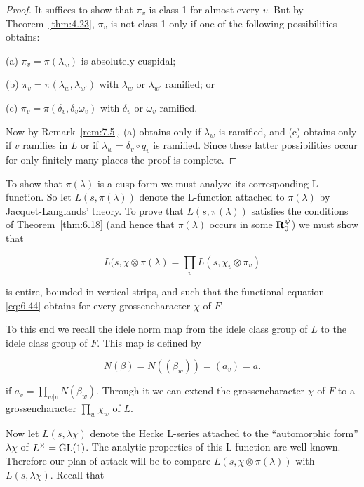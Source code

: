 \begin{proof}

It suffices to show that $\pi_v$ is class 1 for almost every $v$. But by Theorem~\ref{thm:4.23}, $\pi_v$ is not class 1 only if one of the following possibilities obtains:

(a) $\pi_v = \pi(\lambda_w)$ is absolutely cuspidal;

(b) $\pi_v = \pi(\lambda_w, \lambda_{w'})$ with $\lambda_w$ or $\lambda_{w'}$ ramified; or

(c) $\pi_v = \pi(\delta_v, \delta_v\omega_v)$ with $\delta_v$ or $\omega_v$ ramified.

Now by Remark~\ref{rem:7.5}, (a) obtains only if $\lambda_w$ is ramified, and (c) obtains only if $v$ ramifies in $L$ or if $\lambda_w = \delta_v \circ q_v$ is ramified. Since these latter possibilities occur for only finitely many places the proof is complete.

\end{proof}

To show that $\pi(\lambda)$ is a cusp form we must analyze its corresponding L-function. So let $L(s,\pi(\lambda))$ denote the L-function attached to $\pi(\lambda)$ by Jacquet-Langlands' theory. To prove that $L(s,\pi(\lambda))$ satisfies the conditions of Theorem~\ref{thm:6.18} (and hence that $\pi(\lambda)$ occurs in some $\mathbf{R}_0^\psi$) we must show that

\begin{equation}\label{eq:7.24}
L(s, \chi \otimes \pi(\lambda) = \prod_v L(s, \chi_v \otimes \pi_v)\tag{7.24}
\end{equation}

is entire, bounded in vertical strips, and such that the functional equation \eqref{eq:6.44} obtains for every grossencharacter $\chi$ of $F$.

To this end we recall the idele norm map from the idele class group of $L$ to the idele class group of $F$. This map is defined by

\begin{equation}\label{eq:7.25}
N(\beta) = N((\beta_w)) = (a_v) = a.\tag{7.25}
\end{equation}

if $a_v = \prod_{w|v} N(\beta_w)$. Through it we can extend the grossencharacter $\chi$ of $F$ to a grossencharacter $\prod_w \chi_w$ of $L$.

Now let $L(s,\lambda\chi)$ denote the Hecke L-series attached to the ``automorphic form'' $\lambda\chi$ of $L^{\times} = \operatorname{GL}(1)$. The analytic properties of this L-function are well known. Therefore our plan of attack will be to compare $L(s,\chi \otimes \pi(\lambda))$ with $L(s,\lambda\chi)$. Recall that

